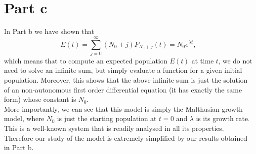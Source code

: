 \section{Part c}
In Part b we have shown that
$$
E(t) = \sum_{j=0}^{\infty} (N_{0}+j)P_{N_{0}+j}(t) = N_{0}e^{\lambda t},
$$
which means that to compute an expected population $E(t)$ at time $t$, we do not need to solve an infinite sum, but simply evaluate a function for a given initial population. Moreover, this shows that the above infinite sum is just the solution of an non-autonomous first order differential equation (it has exactly the same form) whose constant is $N_{0}$.\\
More importantly, we can see that this model is simply the Malthusian growth model, where $N_{0}$ is just the starting population at $t=0$ and $\lambda$ is its growth rate. This is a well-known system that is readily analysed in all its properties. Therefore our study of the model is extremely simplified by our results obtained in Part b. 
